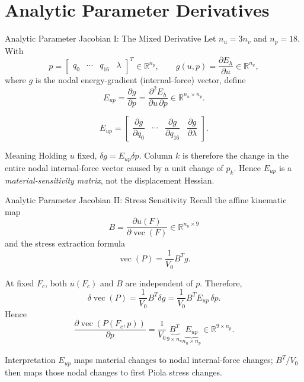 \documentclass[aspectratio=169,10pt]{beamer}
\newcommand{\vect}[1]{\operatorname{vec}\!\left(#1\right)}
\begin{document}
\section{Analytic Parameter Derivatives}

\begin{frame}{Analytic Parameter Jacobian I: The Mixed Derivative}
  \small
  Let $n_u=3n_v$ and $n_p=18$. With
  \[
    p=
    \begin{bmatrix}q_0&\cdots&q_{16}&\lambda\end{bmatrix}^{T}
    \in\mathbb R^{n_p},
    \qquad
    g(u,p)=\frac{\partial E_h}{\partial u}
    \in\mathbb R^{n_u},
  \]
  where $g$ is the nodal energy-gradient (internal-force) vector, define
  \[
    E_{up}
    =
    \frac{\partial g}{\partial p}
    =
    \frac{\partial^2E_h}{\partial u\,\partial p}
    \in\mathbb R^{n_u\times n_p}.
  \]

  \[
    E_{up}
    =
    \begin{bmatrix}
      \dfrac{\partial g}{\partial q_0}
      &\cdots&
      \dfrac{\partial g}{\partial q_{16}}
      &
      \dfrac{\partial g}{\partial\lambda}
    \end{bmatrix}.
  \]

  \begin{block}{Meaning}
    Holding $u$ fixed, $\delta g=E_{up}\delta p$. Column $k$ is therefore the
    change in the entire nodal internal-force vector caused by a unit change
    of $p_k$. Hence $E_{up}$ is a \emph{material-sensitivity matrix}, not the
    displacement Hessian.
  \end{block}
\end{frame}

\begin{frame}{Analytic Parameter Jacobian II: Stress Sensitivity}
  \small
  Recall the affine kinematic map
  \[
    B=\frac{\partial u(F)}{\partial\vect F}
      \in\mathbb R^{n_u\times9}
  \]
  and the stress extraction formula
  \[
    \vect P=\frac1{V_0}B^Tg.
  \]

  At fixed $F_c$, both $u(F_c)$ and $B$ are independent of $p$. Therefore,
  \[
    \delta\vect P
    =
    \frac1{V_0}B^T\delta g
    =
    \frac1{V_0}B^TE_{up}\,\delta p.
  \]
  Hence
  \[
    \boxed{
      \frac{\partial\vect{P(F_c,p)}}{\partial p}
      =
      \frac1{V_0}
      \underbrace{B^T}_{9\times n_u}
      \underbrace{E_{up}}_{n_u\times n_p}
    }
    \in\mathbb R^{9\times n_p}.
  \]

  \begin{block}{Interpretation}
    $E_{up}$ maps material changes to nodal internal-force changes; $B^T/V_0$
    then maps those nodal changes to first Piola stress changes.
  \end{block}
\end{frame}
\end{document}
